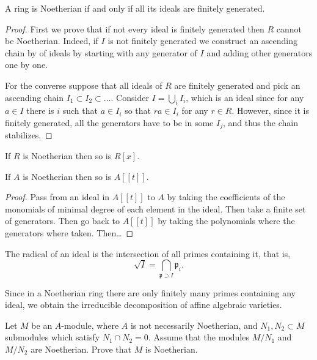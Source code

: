 \begin{exercise}
\label{exercise-noeth-iff-ideal-finit-gene}
A ring is Noetherian if and only if
all its ideals are finitely generated.
\end{exercise}

\begin{proof}
First we prove that if not every ideal is
finitely generated
then $R$ cannot be Noetherian.
Indeed, if $I$ is not finitely generated
we construct an ascending chain by of ideals
by starting with
any generator of $I$ and adding other
generators one by one.

For the converse suppose that all ideals of
$R$ are finitely generated
and pick an ascending chain $I_1\subset
I_2\subset…$.
Consider $I=\bigcup_i I_i$,
which is an ideal since for any $a \in I$
there is $i$ such that $a \in I_i$
so that $ra \in I_i$ for any $r \in R$.
However, since it is finitely generated,
all the generators have to be in some $I_j$,
and thus the chain stabilizes.
\end{proof}

\begin{theorem}
\label{theorem-hilbert-basis}
If $R$ is Noetherian then so is $R[x]$.
\end{theorem}

\begin{exercise}
\label{exercise-hilbe-basis-forma-power}
If $A$ is Noetherian then so is $A[[t]]$.
\end{exercise}

\begin{proof}
Pass from an ideal in $A[[t]]$ to $A$ by
taking
the coefficients of the monomials of minimal
degree
of each element in the ideal.
Then take a finite set of generators.
Then go back to $A[[t]]$ by taking the
polynomials
where the generators where taken.
Then…
\end{proof}

\begin{exercise}
\label{exercise-radical-intersection-primes}
The radical of an ideal is the
intersection of all primes containing it,
that is,
$$
\sqrt{I}
=\bigcap_
{\mathfrak{p} \supset I}\mathfrak{p}_i.
$$
\end{exercise}

\noindent
Since in a Noetherian ring there
are only finitely many primes
containing any ideal, we
obtain the irreducible decomposition
of affine algebraic varieties.

\begin{exercise}
\label{exercise-intersection-submodules-noet}
Let $M$ be an $A$-module, where $A$
is not necessarily Noetherian,
and $N_1,N_2 \subset M$ submodules
which satisfy $N_1 \cap N_2 = 0$.
Assume that the modules $M/N_1$
and $M/N_2$ are Noetherian.
Prove that $M$ is Noetherian.
\end{exercise}

